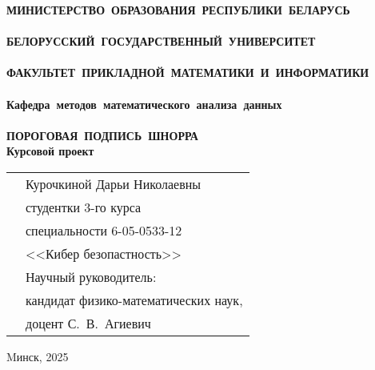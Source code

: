 \setcounter{page}{1}
\thispagestyle{empty}
\begin{center}
\bf
\vspace{4cm}
{
\mbox{МИНИСТЕРСТВО~ОБРАЗОВАНИЯ~РЕСПУБЛИКИ~БЕЛАРУСЬ} \\~\\
\mbox{БЕЛОРУССКИЙ~ГОСУДАРСТВЕННЫЙ~УНИВЕРСИТЕТ} \\~\\
\mbox{ФАКУЛЬТЕТ~ПРИКЛАДНОЙ~МАТЕМАТИКИ~И~ИНФОРМАТИКИ} \\~\\
\mbox{Кафедра~методов~математического~анализа~данных} \\~\\
}
\vspace{4cm}
\bf
\mbox{ПОРОГОВАЯ ПОДПИСЬ ШНОРРА}\\
\vspace{1cm}
\rm Курсовой проект 
\vspace{3cm}
\end{center}
\begin{tabular}{ll}
\hspace{10.5cm}
&Курочкиной Дарьи Николаевны~\\
&студентки 3-го курса\\
&специальности 6-05-0533-12\\
&<<Кибер безопастность>>~\\
&Научный руководитель:\\
&кандидат физико-математических наук, \\
&доцент С.~В.~Агиевич
\end{tabular}
\vspace{4cm}
\begin{center}
Mинск, 2025
\end{center}
\clearpage
\restoregeometry